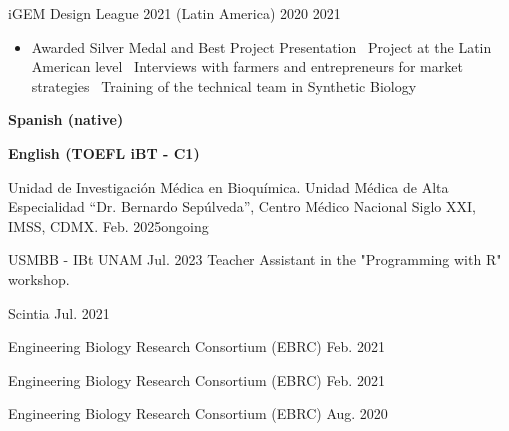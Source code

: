 \documentclass{simplecv}
\newcommand{\mydot}{\raisebox{0.5 ex}{.}\ }
\begin{document}
    {iGEM Design League 2021 (Latin America)}
    {}
    {2020}
    {2021}
    {%
        \vspace{-11pt}
        \begin{itemize}[leftmargin=*]
        \setlength{\itemsep}{0cm}
          \item Awarded Silver Medal and Best Project Presentation \mydot Project at the Latin American level \mydot Interviews with farmers and entrepreneurs for market strategies \mydot Training of the technical team in Synthetic Biology
        \end{itemize}
    }

\newpage

\vspace{-0.5cm}
\printbibliography[heading=none]

\medskip
    
\begin{multicols}{2}
  

  \textbf{Spanish (native)}\\

  \medskip

  \textbf{English (TOEFL iBT - C1)}\\

\vfill\null\columnbreak

      {Unidad de Investigación Médica en Bioquímica. Unidad Médica de Alta Especialidad “Dr. Bernardo Sepúlveda”, Centro Médico Nacional Siglo XXI, IMSS, CDMX.}
      {}
      {Feb. 2025}{ongoing}
      {}

      {USMBB - IBt UNAM}
      {}
      {}{Jul. 2023}
      {Teacher Assistant in the "Programming with R" workshop.}

      {Scintia}
      {}
      {}{Jul. 2021}
      {}

      {Engineering Biology Research Consortium (EBRC)}
      {}
      {}{Feb. 2021}
      {}

      {Engineering Biology Research Consortium (EBRC)}
      {}
      {}{Feb. 2021}
      {}

      {Engineering Biology Research Consortium (EBRC)}
      {}
      {}{Aug. 2020}
      {}
\end{multicols}
\end{document}
